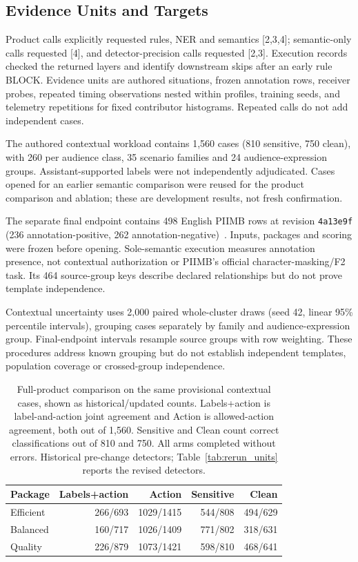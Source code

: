 \documentclass[sigconf]{acmart}
\theoremstyle{acmdefinition}\newtheorem{property}{Property}
\begin{document}
\subsection{Evidence Units and Targets}
Product calls explicitly requested rules, NER and semantics [2,3,4]; semantic-only calls requested [4], and detector-precision calls requested [2,3]. Execution records checked the returned layers and identify downstream skips after an early rule BLOCK. Evidence units are authored situations, frozen annotation rows, receiver probes, repeated timing observations nested within profiles, training seeds, and telemetry repetitions for fixed contributor histograms. Repeated calls do not add independent cases.

The authored contextual workload contains 1,560 cases (810 sensitive, 750 clean), with 260 per audience class, 35 scenario families and 24 audience-expression groups. Assistant-supported labels were not independently adjudicated. Cases opened for an earlier semantic comparison were reused for the product comparison and ablation; these are development results, not fresh confirmation.

The separate final endpoint contains 498 English PIIMB rows at revision \texttt{4a13e9f} (236 annotation-positive, 262 annotation-negative)~\cite{PIIMBPinned2026}. Inputs, packages and scoring were frozen before opening. Sole-semantic execution measures annotation presence, not contextual authorization or PIIMB's official character-masking/F2 task. Its 464 source-group keys describe declared relationships but do not prove template independence.

Contextual uncertainty uses 2,000 paired whole-cluster draws (seed 42, linear 95\% percentile intervals), grouping cases separately by family and audience-expression group. Final-endpoint intervals resample source groups with row weighting. These procedures address known grouping but do not establish independent templates, population coverage or crossed-group independence.

\begin{table}[!t]
\centering
\caption{Full-product comparison on the same provisional contextual cases, shown as historical/updated counts. Labels+action is label-and-action joint agreement and Action is allowed-action agreement, both out of 1,560. Sensitive and Clean count correct classifications out of 810 and 750. All arms completed without errors. Historical pre-change detectors; Table~\ref{tab:rerun_units} reports the revised detectors.}
\label{tab:pipeline_v1_v3}
\small
\setlength{\tabcolsep}{4pt}
\begin{tabular}{lrrrr}
\toprule
Package & Labels+action & Action & Sensitive & Clean \\
\midrule
Efficient &266/693 &1029/1415 &544/808 &494/629 \\
Balanced &160/717 &1026/1409 &771/802 &318/631 \\
Quality &226/879 &1073/1421 &598/810 &468/641 \\
\bottomrule
\end{tabular}
\end{table}
\end{document}
